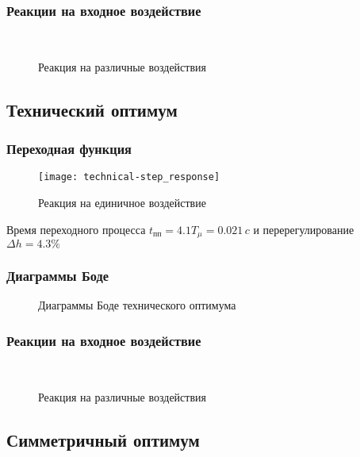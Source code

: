 			\subsubsection{Реакции на входное воздействие}
				\begin{figure}[H]
					\centering
					\\
					\centering{}
					\caption{Реакция на различные воздействия}
				\end{figure}
		\subsection{Технический оптимум}
			\subsubsection{Переходная функция}
				\begin{figure}[H]
					\centering
					\texttt{[image: technical-step\_response]}
					\caption{Реакция на единичное воздействие}
				\end{figure}
				Время переходного процесса $t_{\text{пп}}=4.1T_{\mu}=0.021\,c$ и перерегулирование $\Delta h=4.3\%$
			\subsubsection{Диаграммы Боде}
				\begin{figure}[H]
					\centering
					\caption{Диаграммы Боде технического оптимума}
				\end{figure}
			\subsubsection{Реакции на входное воздействие}
				\begin{figure}[H]
					\centering
					\\
					\centering{}
					\caption{Реакция на различные воздействия}
				\end{figure}
		\subsection{Симметричный оптимум}
